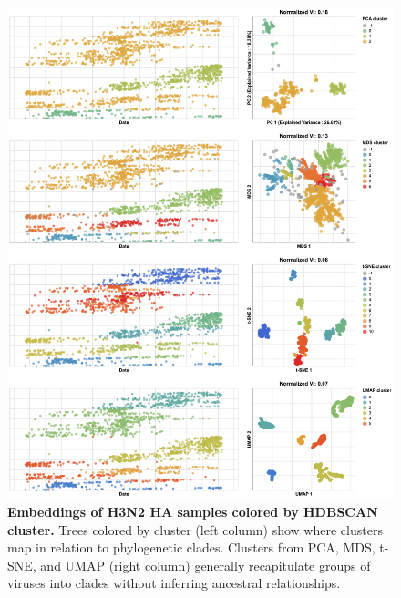 \documentclass[10pt,letterpaper]{article}
\begin{document}
\begin{figure}[!h]
\includegraphics[width=\columnwidth]{figures/flu-2016-2018-ha-embeddings-by-cluster.png}
\caption{{\bf Embeddings of H3N2 HA samples colored by HDBSCAN cluster.}
  Trees colored by cluster (left column) show where clusters map in relation to phylogenetic clades.
  Clusters from PCA, MDS, t-SNE, and UMAP (right column) generally recapitulate groups of viruses into clades without inferring ancestral relationships.}
\label{fig:seasonal-influenza-h3n2-ha-2016-2018-clusters}
\end{figure}
\end{document}
